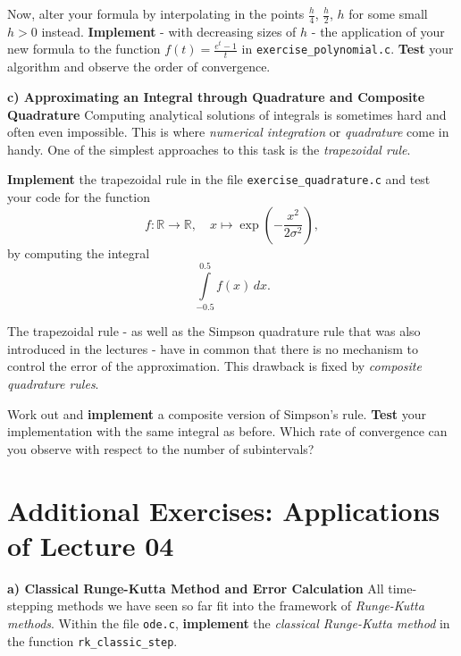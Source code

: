 \documentclass[a4paper]{scrartcl}
\begin{document}
Now, alter your formula by interpolating in the points $\frac{h}{4}$, $\frac{h}{2}$, $h$ for some small $h>0$ instead. \textbf{Implement} - with decreasing sizes of $h$ - the application of your new formula to the function $f(t)=\frac{e^{t}-1}{t}$ in \texttt{exercise\_polynomial.c}. \textbf{Test} your algorithm and observe the order of convergence.
\newline

\textbf{c) Approximating an Integral through Quadrature and Composite Quadrature}\newline\newline
Computing analytical solutions of integrals is sometimes hard and often even
impossible. 
This is where \emph{numerical integration} or \emph{quadrature} come in handy. One of the simplest approaches to this task is the \emph{trapezoidal rule}.

\textbf{Implement} the trapezoidal rule in the file \texttt{exercise\_quadrature.c} and test your code for
the function
\begin{equation*}
	f : \mathbb R \to \mathbb R, \quad x \mapsto \exp\left(-\frac{x^2}{2 \sigma^2}\right),
\end{equation*}
by computing the integral
\begin{equation*}
	\int\limits_{-0.5}^{0.5} f(x) \, d x.
\end{equation*}

The trapezoidal rule - as well as the Simpson quadrature rule that was also introduced in the lectures - have in common that there is no mechanism to control the error
of the approximation. This drawback is fixed by \emph{composite quadrature rules}.

Work out and \textbf{implement} a composite version of Simpson's rule. \textbf{Test} your implementation with the same integral as before. Which rate of convergence can you observe with respect to the number
of subintervals?

\section*{Additional Exercises: Applications of Lecture 04}

\textbf{a) Classical Runge-Kutta Method and Error Calculation}\newline\newline
All time-stepping methods we have seen so far fit into the framework of
\emph{Runge-Kutta methods}. Within the file \texttt{ode.c}, \textbf{implement} the \emph{classical Runge-Kutta method} in the function \texttt{rk\_classic\_step}.
\end{document}
